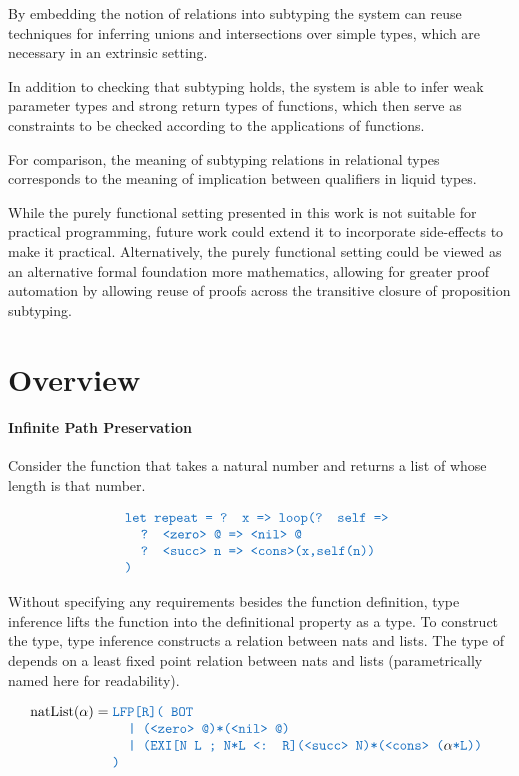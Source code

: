 \documentclass[acmsmall]{acmart}
\theoremstyle{definition}
\begin{document}
By embedding the notion of relations into subtyping the system can reuse techniques for inferring unions and
intersections over simple types, which are necessary in an extrinsic setting. 

In addition to checking that subtyping holds, the system is able to infer weak 
parameter types and strong return types of functions, which then serve as constraints
to be checked according to the applications of functions.

For comparison, the meaning of subtyping relations in relational types corresponds 
to the meaning of implication between qualifiers in liquid types.

While the purely functional setting presented in this work is not suitable for practical programming,
future work could extend it to incorporate side-effects to make it practical.
Alternatively, the purely functional setting could be viewed as an alternative formal foundation more
mathematics, allowing for greater proof automation by allowing reuse of proofs across the transitive closure of 
proposition subtyping.


\section{Overview}


\paragraph{Infinite Path Preservation} 
Consider the function  that takes a natural number and returns a list of whose length is that number. 

\[
  \begin{array}[t]{@{} l}
      \J{let repeat = ? x => loop(? self =>}
      \\
      \I \J{? <zero> @ => <nil> @}
      \\
      \I \J{? <succ> n => <cons>(x,self(n))}
      \\
      \J{)}
  \end{array}
\]


Without specifying any requirements besides the function definition, type inference lifts 
the function into the definitional property as a type. 
To construct the type, type inference constructs a relation between nats and lists.
The type of  depends on a least fixed point relation between nats and lists 
(parametrically named here for readability).

\[
  \text{natList}(\alpha) = \begin{array}[t]{@{} l}
      \J{LFP[R]( BOT} 
      \\
      \I \J{| (<zero> @)*(<nil> @)}
      \\
      \I \J{| (EXI[N L ; N*L <: R](<succ> N)*(<cons> (}\alpha\J{*L))}
      \\
      \J{)} 
  \end{array}
\]
\end{document}
